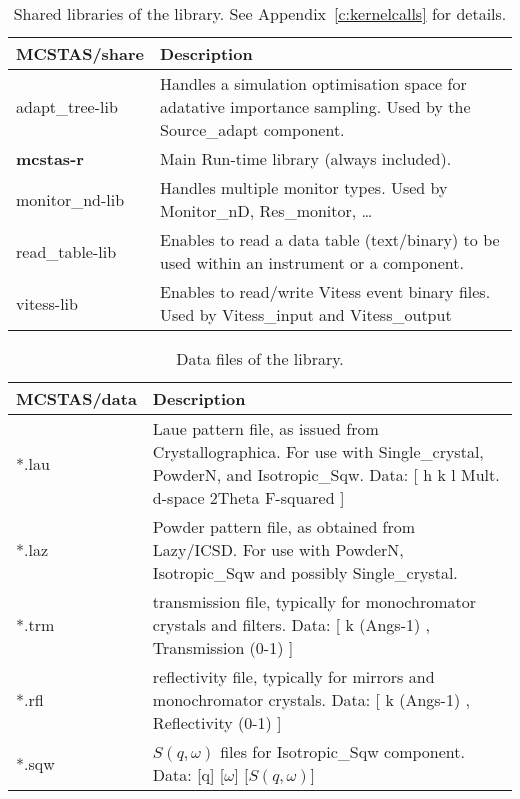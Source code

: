 \begin{table}
  \begin{center}
    {\let\my=\\
    \begin{tabular}{|p{}|p{}|}
      \hline
       {\bf MCSTAS/share} & Description \\
       \hline
       adapt\_tree-lib  & Handles a simulation optimisation space for
       adatative importance sampling.
                          Used by the Source\_adapt component. \\
       {\bf mcstas-r}      &   Main Run-time library (always included). \\
       monitor\_nd-lib & Handles multiple monitor types.
                        Used by Monitor\_nD, Res\_monitor, \ldots \\
       read\_table-lib  & Enables to read a data table (text/binary) to be used within
                          an instrument or a component. \\
       vitess-lib &     Enables to read/write Vitess event binary files.
                        Used by Vitess\_input and Vitess\_output \\
      \hline
    \end{tabular}
    \caption{Shared libraries of the \MCS library. See Appendix~\ref{c:kernelcalls} for details.}
    \label{t:comp-share}
    }
  \end{center}
\end{table}

\begin{table}
  \begin{center}
    {\let\my=\\
    \begin{tabular}{|p{}|p{}|}
      \hline
       {\bf MCSTAS/data} & Description \\
       \hline
 *.lau & Laue pattern file, as issued from Crystallographica.
       For use with Single\_crystal, PowderN, and Isotropic\_Sqw.
       Data: [ h   k   l Mult. d-space 2Theta   F-squared ] \\
 *.laz & Powder pattern file, as obtained from Lazy/ICSD.
       For use with PowderN, Isotropic\_Sqw and possibly Single\_crystal.\\
 *.trm & transmission file, typically for monochromator crystals and filters.
       Data: [ k (Angs-1) , Transmission (0-1) ] \\
 *.rfl & reflectivity file, typically for mirrors and monochromator crystals.
       Data: [ k (Angs-1) , Reflectivity (0-1) ] \\
 *.sqw & $S(q,\omega)$ files for Isotropic\_Sqw component.
       Data: [q] [$\omega$] [$S(q,\omega)$]\\
      \hline
    \end{tabular}
    \caption{Data files of the \MCS library.}
    \label{t:comp-data}
    }
  \end{center}
\end{table}

